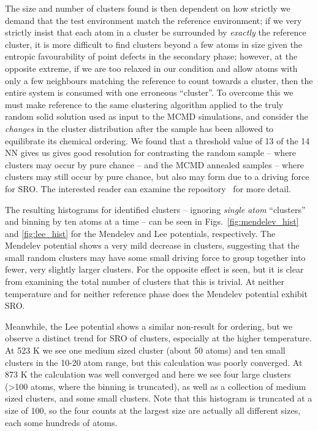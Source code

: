 The size and number of clusters found is then dependent on how strictly we demand that the test environment match the reference environment;
if we very strictly insist that each atom in a cluster be surrounded by \emph{exactly} the reference cluster, it is more difficult to find clusters beyond a few atoms in size given the entropic favourability of point defects in the secondary phase;
however, at the opposite extreme, if we are too relaxed in our condition and allow atoms with only a few neighbours matching the reference to count towards a cluster, then the entire system is consumed with one erroneous ``cluster''.
To overcome this we must make reference to the same clustering algorithm applied to the truly random solid solution used as input to the MCMD simulations, and consider the \emph{changes} in the cluster distribution after the sample has been allowed to equilibrate its chemical ordering.
We found that a threshold value of 13 of the 14 NN gives us gives good resolution for contrasting the random sample -- where clusters may occur by pure chance -- and the MCMD annealed samples -- where clusters may still occur by pure chance, but also may form due to a driving force for SRO.
The interested reader can examine the  repository~\cite{feal} for more detail.

The resulting histograms for identified clusters -- ignoring \emph{single atom} ``clusters'' and binning by ten atoms at a time -- can be seen in Figs.~\ref{fig:mendelev_hist} and \ref{fig:lee_hist} for the Mendelev and Lee potentials, respectively.
The Mendelev potential shows a very mild decrease in \DOTHREE clusters, suggesting that the small random clusters may have some small driving force to group together into fewer, very slightly larger clusters. For \BTWO the opposite effect is seen, but it is clear from examining the total number of clusters that this is trivial.
At neither temperature and for neither reference phase does the Mendelev potential exhibit SRO.

Meanwhile, the Lee potential shows a similar non-result for \BTWO ordering, but we observe a distinct trend for SRO of \DOTHREE clusters, especially at the higher temperature.
At 523 K we see one medium sized cluster (about 50 atoms) and ten small clusters in the 10-20 atom range,
but this calculation was poorly converged.
At 873 K the calculation was well converged and here we see four large clusters (>100 atoms, where the binning is truncated), as well as a collection of medium sized clusters, and some small clusters.
Note that this histogram is truncated at a size of 100, so the four counts at the largest size are actually all different sizes, each some hundreds of atoms.

